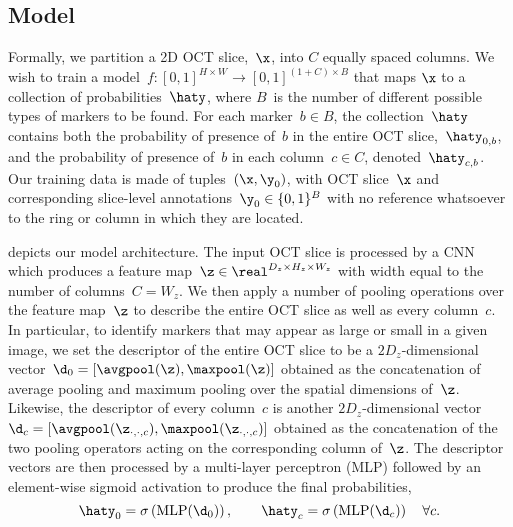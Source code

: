 \subsection{Model}

Formally, we partition a 2D OCT slice,~$\x$, into $C$ equally spaced columns. We wish to train a model~$f:[0,1]^{H\times W} \to [0,1]^{(1+C)\times B}$ that maps $\x$ to a collection of probabilities~$\haty$, where $B$~is the number of different possible types of markers to be found. For each marker~$b\in B$, the collection~$\haty$ contains both the probability of presence of~$b$ in the entire OCT slice,~$\haty_{0,b}$, and the probability of presence of~$b$ in each column~$c\in C$, denoted~$\haty_{c, b}$. Our training data is made of tuples~$(\x, \y_0)$, with OCT slice~$\x$ and corresponding slice-level annotations~$\y_0\in\{0, 1\}^B$ with no reference whatsoever to the ring or column in which they are located.


 depicts our model architecture. The input OCT slice is processed by a CNN which produces a feature map~$\z \in \real^{D_z\times H_z\times W_z}$ with width equal to the number of columns~$C = W_z$. We then apply a number of pooling operations over the feature map~$\z$ to describe the entire OCT slice as well as every column~$c$. In particular, to identify markers that may appear as large or small in a given image, we set the descriptor of the entire OCT slice to be a $2D_z$-dimensional vector~$\d_0=[\avgpool(\z), \maxpool(\z)]$ obtained as the concatenation of average pooling and maximum pooling over the spatial dimensions of~$\z$. Likewise, the descriptor of every column~$c$ is another $2D_z$-dimensional vector~$\d_c=[\avgpool(\z_{\cdot,\cdot,c}), \maxpool(\z_{\cdot,\cdot,c})]$ obtained as the concatenation of the two pooling operators acting on the corresponding column of~$\z$. The descriptor vectors are then processed by a multi-layer perceptron (MLP) followed by an element-wise sigmoid activation to produce the final probabilities,
\begin{equation}
    \haty_0 = \sigma\left(\textrm{MLP}(\d_0)\right),\quad \quad 
    \haty_c = \sigma\left(\textrm{MLP}(\d_c)\right) \quad \forall c.
\end{equation}

